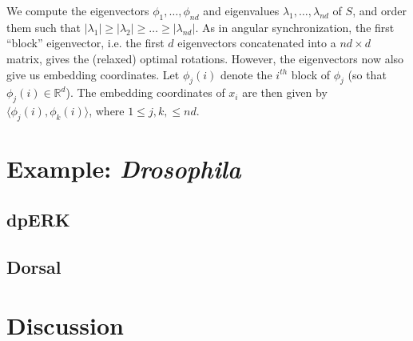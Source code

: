 \documentclass[12pt]{article}
\begin{document}
We compute the eigenvectors $\phi_1, \dots, \phi_{nd}$ and eigenvalues $\lambda_1, \dots, \lambda_{nd}$ of $S$, and order them such that $|\lambda_1| \ge |\lambda_2| \ge \dots \ge |\lambda_{nd}|$.
%
As in angular synchronization, the first ``block'' eigenvector, i.e. the first $d$ eigenvectors concatenated into a $nd \times d$ matrix, gives the (relaxed) optimal rotations. 
%
However, the eigenvectors now also give us embedding coordinates.
%
Let $\phi_j(i)$ denote the $i^{th}$ block of $\phi_j$ (so that $\phi_j(i) \in \mathbb{R}^d$). 
%
The embedding coordinates of $x_i$ are then given by $\langle \phi_j(i), \phi_k(i) \rangle$, where $1 \le j, k, \le nd$. 

\section{Example: {\em Drosophila}}

\subsection{dpERK}

\subsection{Dorsal}

\section{Discussion}
\end{document}
